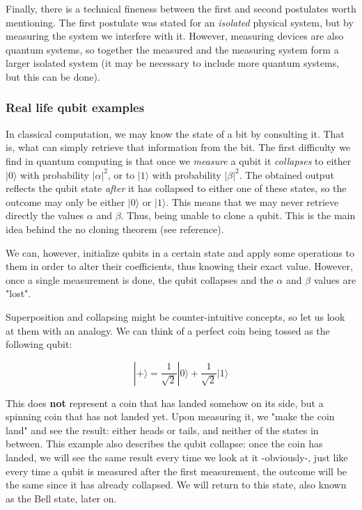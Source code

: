 Finally, there is a technical fineness between the first and second postulates worth mentioning. The first postulate was stated for an \emph{isolated} physical system, but by measuring the system we interfere with it. However, measuring devices are also quantum systems, so together the measured and the measuring system form a larger isolated system (it may be necessary to include more quantum systems, but this can be done).


\subsubsection{Real life qubit examples}


In classical computation, we may know the state of a bit by consulting it. That is, what can simply retrieve that information from the bit. The first difficulty we find in quantum computing is that once we \emph{measure} a qubit it \emph{collapses} to either $|0\rangle$ with probability $|\alpha|^2$, or to $|1\rangle$ with probability $|\beta|^2$. The obtained output reflects the qubit state \emph{after} it has collapsed to either one of these states, so the outcome may only be either $|0\rangle$ or $|1\rangle$. This means that we may never retrieve directly the values $\alpha$ and $\beta$. Thus, being unable to clone a qubit. This is the main idea behind the no cloning theorem (see reference).

We can, however, initialize qubits in a certain state and apply some operations to them in order to alter their coefficients, thus knowing their exact value. However, once a single measurement is done, the qubit collapses and the $\alpha$ and $\beta$ values are "lost".

Superposition and collapsing might be counter-intuitive concepts, so let us look at them with an analogy. We can think of a perfect coin being tossed as the following qubit:

$$ |+\rangle = \frac{1}{\sqrt{2}} |0\rangle + \frac{1}{\sqrt{2}} |1\rangle $$

This does \textbf{not} represent a coin that has landed somehow on its side, but a spinning coin that has not landed yet. Upon measuring it, we "make the coin land" and see the result: either heads or tails, and neither of the states in between. This example also describes the qubit collapse: once the coin has landed, we will see the same result every time we look at it -obviously-, just like every time a qubit is measured after the first measurement, the outcome will be the same since it has already collapsed. We will return to this state, also known as the Bell state, later on.

